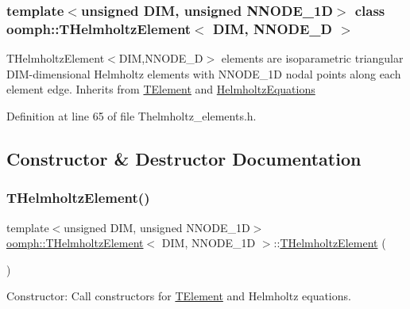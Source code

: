 \subsubsection*{template$<$unsigned D\+IM, unsigned N\+N\+O\+D\+E\+\_\+1D$>$\newline
class oomph\+::\+T\+Helmholtz\+Element$<$ D\+I\+M, N\+N\+O\+D\+E\+\_\+D $>$}

T\+Helmholtz\+Element$<$\+D\+I\+M,\+N\+N\+O\+D\+E\+\_\+D$>$ elements are isoparametric triangular D\+I\+M-\/dimensional Helmholtz elements with N\+N\+O\+D\+E\+\_\+1D nodal points along each element edge. Inherits from \hyperlink{classoomph_1_1TElement}{T\+Element} and \hyperlink{classoomph_1_1HelmholtzEquations}{Helmholtz\+Equations} 

Definition at line 65 of file Thelmholtz\+\_\+elements.\+h.



\subsection{Constructor \& Destructor Documentation}
\mbox{\label{classoomph_1_1THelmholtzElement_af122fd610721ab511e4cc62b48974ed3}} 
\subsubsection{\texorpdfstring{T\+Helmholtz\+Element()}{THelmholtzElement()}\hspace{0.1cm}{\footnotesize\ttfamily [1/2]}}
{\footnotesize\ttfamily template$<$unsigned D\+IM, unsigned N\+N\+O\+D\+E\+\_\+1D$>$ \\
\hyperlink{classoomph_1_1THelmholtzElement}{oomph\+::\+T\+Helmholtz\+Element}$<$ D\+IM, N\+N\+O\+D\+E\+\_\+1D $>$\+::\hyperlink{classoomph_1_1THelmholtzElement}{T\+Helmholtz\+Element} (\begin{DoxyParamCaption}{ }\end{DoxyParamCaption})\hspace{0.3cm}{\ttfamily [inline]}}



Constructor\+: Call constructors for \hyperlink{classoomph_1_1TElement}{T\+Element} and Helmholtz equations. 



